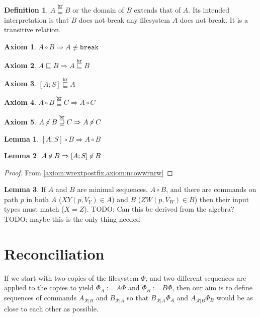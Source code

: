 \documentclass[12pt]{article}
\newcommand{\FS}{\Phi} %
\newcommand{\cbrk}{\mathtt{break}}
\newcommand{\fscommand}[2]{{#1#2}}
\newcommand{\cxy}{\fscommand{X}{Y}}
\newcommand{\czw}{\fscommand{Z}{W}}
\newcommand{\eqext}{\sqsubseteq}
\newcommand{\nequiv}{\not\equiv}
\newcommand{\wrext}{\stackrel{\mathtt{br}}{\sqsubseteq}}
\newcommand{\wrnrw}{\stackrel{\mathtt{br}}{\sqsupseteq}}
\newcommand{\coworks}{\circ}
\newcommand{\ncoworks}{\centernot\circ}
\newcommand{\recchar}[3]{{#1}^{#3}_{\mathcal{R}|{#2}}}
\newcommand{\reca}{\recchar{A}{B}{}} %
\newcommand{\recb}{\recchar{B}{A}{}}
\theoremstyle{definition}
\newtheorem{mydef}{Definition}
\newtheorem{myax}{Axiom}
\newtheorem{mylem}{Lemma}
\begin{document}
\begin{mydef}{$A\wrext B$}
or the domain of $B$ extends that of $A$.
Its intended interpretation is that
$B$ does not break any filesystem $A$ does not break.
It is a transitive relation.
\end{mydef}

\begin{myax}$A\coworks B \Rightarrow A\nequiv\cbrk$\end{myax}
\begin{myax}$A\eqext B \Rightarrow A\wrext B$\end{myax}
\begin{myax}\label{axiom:wrextpostfix}$[A;S] \wrext A$\end{myax}
\begin{myax}$A\coworks B\wrext C \Rightarrow A\coworks C$\end{myax}
\begin{myax}\label{axiom:ncowwrnrw}$A\ncoworks B\wrnrw C \Rightarrow A\ncoworks C$\end{myax}

\begin{mylem}\label{lemma:cowdelfix}$[A;S]\coworks B \Rightarrow A\coworks B$\end{mylem}
\begin{mylem}\label{lemma:ncowpostfix}$A\ncoworks B \Rightarrow [A;S]\ncoworks B$\end{mylem}
\begin{proof}From \cref{axiom:wrextpostfix,axiom:ncowwrnrw}\end{proof}

\begin{mylem}\label{lemma:cowinputmatch}
If $A$ and $B$ are minimal sequences, $A\coworks B$,
and there are commands on path $p$ in both $A$ ($\cxy(p, V_Y)\in A$) and $B$ ($\czw(p, V_W)\in B$)
then their input types must match ($X=Z$).
TODO: Can this be derived from the algebra?
TODO: maybe this is the only thing needed
\end{mylem}

\section{Reconciliation}

If we start with two copies of the filesystem $\FS$,
and two different sequences are applied to the copies to yield $\FS_A:=A\FS$
and $\FS_B:=B\FS$, then our aim is to define sequences of commands $\reca$ and $\recb$
so that $\recb\FS_A$ and $\reca\FS_B$ would be as close to each other as possible.
\end{document}
